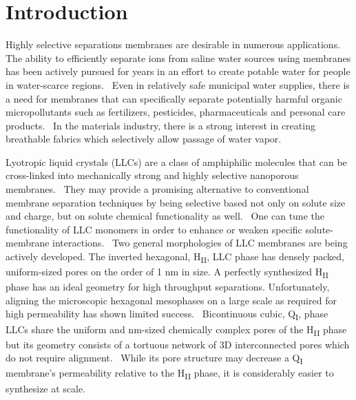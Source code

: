\documentclass[aps,pre,preprint,groupedaddress]{revtex4-2}
\begin{document}
  \maketitle
  
  \graphicspath{{./figures/}}

  \section{Introduction}

  Highly selective separations membranes are desirable in numerous applications. 
  The ability to efficiently separate ions from saline water sources using membranes 
  has been actively pursued for years in an effort to create potable water for people 
  in water-scarce regions.~\cite{werber_materials_2016} Even in relatively safe
  municipal water supplies, there is a need for membranes that can specifically separate
  potentially harmful organic micropollutants such as fertilizers, pesticides, pharmaceuticals
  and personal care products.~\cite{barbosa_occurrence_2016} In the materials industry,
  there is a strong interest in creating breathable fabrics which selectively allow 
  passage of water vapor.~\cite{mondloch_destruction_2015}

  Lyotropic liquid crystals (LLCs) are a class of amphiphilic molecules that can be 
  cross-linked into mechanically strong and highly selective nanoporous membranes.~\cite{gin_polymerized_2008}
  They may provide a promising alternative to conventional membrane separation techniques
  by being selective based not only on solute size and charge, but on solute chemical 
  functionality as well.~\cite{dischinger_application_2017} One can tune the functionality
  of LLC monomers in order to enhance or weaken specific solute-membrane interactions.~\cite{dischinger_effect_2017}
  Two general morphologies of LLC membranes are being actively developed. The inverted hexagonal, 
  H\textsubscript{II}, LLC phase has densely packed, uniform-sized pores on the order of 1 nm
  in size. A perfectly synthesized H\textsubscript{II} phase has an ideal geometry for high
  throughput separations. 
  Unfortunately, aligning the microscopic hexagonal mesophases on a large 
  scale 
  as required for high permeability
  has shown limited success.~\cite{feng_scalable_2014,feng_thin_2016} Bicontinuous cubic,
  Q\textsubscript{I}, phase LLCs share the uniform and nm-sized chemically complex pores of
  the H\textsubscript{II} phase but its geometry consists of a tortuous network of 3D 
  interconnected pores which do not require alignment.~\cite{carter_glycerol-based_2012} While 
  its pore structure may decrease a Q\textsubscript{I} membrane's permeability relative to the
  H\textsubscript{II} phase, it is considerably easier to synthesize at scale.~\cite{hatakeyama_nanoporous_2010}
  
\end{document}
